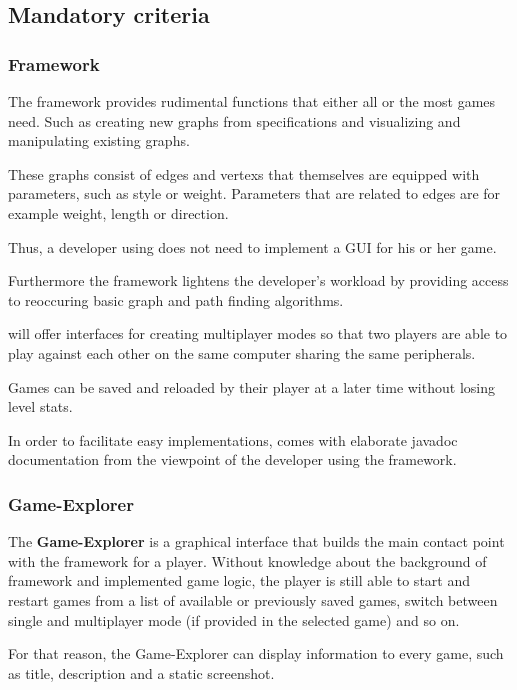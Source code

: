 \subsection{Mandatory criteria}
\label{mandatory-criteria}
\subsubsection{Framework}
The framework provides rudimental functions that either all or the most \glspl{game} need. Such as creating new \glspl{graph} from specifications and visualizing and manipulating existing graphs.\par
These graphs consist of \glspl{edge} and \glspl{vertex} that themselves are equipped with parameters, such as style or weight. Parameters that are related to edges are for example weight, length or direction.\par
Thus, a \gls{developer} using {\graphioli} does not need to implement a \gls{GUI} for his or her game.\par
Furthermore the framework lightens the developer's workload by providing access to reoccuring basic graph and \gls{path} finding algorithms.\par
{\graphioli} will offer interfaces for creating multiplayer modes so that two \glspl{player} are able to play against each other on the same computer sharing the same peripherals.\par
Games can be saved and reloaded by their player at a later time without losing \gls{level} stats.\par
In order to facilitate easy implementations, {\graphioli} comes with elaborate \Gls{javadoc} documentation from the viewpoint of the developer using the framework.\par

\subsubsection{Game-Explorer}
The \textbf{Game-Explorer} is a graphical interface that builds the main contact point with the framework for a \gls{player}. Without knowledge about the background of framework and implemented \gls{game} logic, the player is still able to start and restart games from a list of available or previously saved games, switch between single and multiplayer mode (if provided in the selected game) and so on.\par
For that reason, the Game-Explorer can display information to every game, such as title, description and a static screenshot.\par

